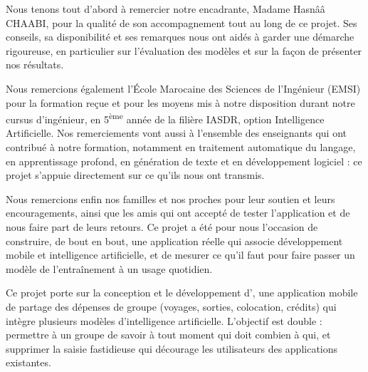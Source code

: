 

Nous tenons tout d'abord à remercier notre encadrante, Madame Hasnââ CHAABI, pour
la qualité de son accompagnement tout au long de ce projet. Ses conseils, sa
disponibilité et ses remarques nous ont aidés à garder une démarche rigoureuse, en
particulier sur l'évaluation des modèles et sur la façon de présenter nos résultats.

Nous remercions également l'École Marocaine des Sciences de l'Ingénieur (EMSI) pour la
formation reçue et pour les moyens mis à notre disposition durant notre cursus
d'ingénieur, en 5\textsuperscript{ème} année de la filière IASDR, option Intelligence
Artificielle. Nos remerciements vont aussi à l'ensemble des enseignants qui ont
contribué à notre formation, notamment en traitement automatique du langage, en
apprentissage profond, en génération de texte et en développement logiciel : ce projet
s'appuie directement sur ce qu'ils nous ont transmis.

Nous remercions enfin nos familles et nos proches pour leur soutien et leurs
encouragements, ainsi que les amis qui ont accepté de tester l'application et de nous
faire part de leurs retours. Ce projet a été pour nous l'occasion de construire, de bout
en bout, une application réelle qui associe développement mobile et intelligence
artificielle, et de mesurer ce qu'il faut pour faire passer un modèle de l'entraînement
à un usage quotidien.


Ce projet porte sur la conception et le développement d'\equipay, une application
mobile de partage des dépenses de groupe (voyages, sorties, colocation, crédits) qui
intègre plusieurs modèles d'intelligence artificielle. L'objectif est double : permettre
à un groupe de savoir à tout moment qui doit combien à qui, et supprimer la saisie
fastidieuse qui décourage les utilisateurs des applications existantes.


